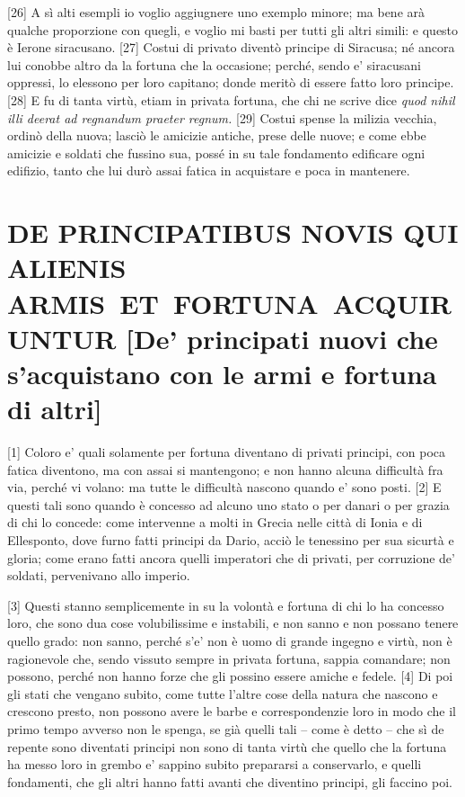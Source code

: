 {[}26{]} A sì alti esempli io voglio aggiugnere uno exemplo minore; ma
bene arà qualche proporzione con quegli, e voglio mi basti per tutti gli
altri simili: e questo è Ierone siracusano. {[}27{]} Costui di privato
diventò principe di Siracusa; né ancora lui conobbe altro da la fortuna
che la occasione; perché, sendo e' siracusani oppressi, lo elessono per
loro capitano; donde meritò di essere fatto loro principe. {[}28{]} E fu
di tanta virtù, etiam in privata fortuna, che chi ne scrive dice
\emph{quod nihil illi deerat ad regnandum praeter regnum.} {[}29{]}
Costui spense la milizia vecchia, ordinò della nuova; lasciò le amicizie
antiche, prese delle nuove; e come ebbe amicizie e soldati che fussino
sua, possé in su tale fondamento edificare ogni edifizio, tanto che lui
durò assai fatica in acquistare e poca in mantenere.

\quebra\section{DE PRINCIPATIBUS NOVIS QUI ALIENIS ARMIS~ET~FORTUNA~ACQUIRUNTUR\break
{[}De' principati nuovi che s'acquistano con le armi e fortuna di altri{]}}

{[}1{]} Coloro e' quali solamente per fortuna diventano di privati
principi, con poca fatica diventono, ma con assai si mantengono; e non
hanno alcuna difficultà fra via, perché vi volano: ma tutte le
difficultà nascono quando e' sono posti. {[}2{]} E questi tali sono
quando è concesso ad alcuno uno stato o per danari o per grazia di chi
lo concede: come intervenne a molti in Grecia nelle città di Ionia e di
Ellesponto, dove furno fatti principi da Dario, acciò le tenessino per
sua sicurtà e gloria; come erano fatti ancora quelli imperatori che di
privati, per corruzione de' soldati, pervenivano allo imperio.

{[}3{]} Questi stanno semplicemente in su la volontà e fortuna di chi lo
ha concesso loro, che sono dua cose volubilissime e instabili, e non
sanno e non possano tenere quello grado: non sanno, perché s'e' non è
uomo di grande ingegno e virtù, non è ragionevole che, sendo vissuto
sempre in privata fortuna, sappia comandare; non possono, perché non
hanno forze che gli possino essere amiche e fedele. {[}4{]} Di poi gli
stati che vengano subito, come tutte l'altre cose della natura che
nascono e crescono presto, non possono avere le barbe e correspondenzie
loro in modo che il primo tempo avverso non le spenga, se già quelli
tali -- come è detto -- che sì de repente sono diventati principi non
sono di tanta virtù che quello che la fortuna ha messo loro in grembo e'
sappino subito prepararsi a conservarlo, e quelli fondamenti, che gli
altri hanno fatti avanti che diventino principi, gli faccino poi.

